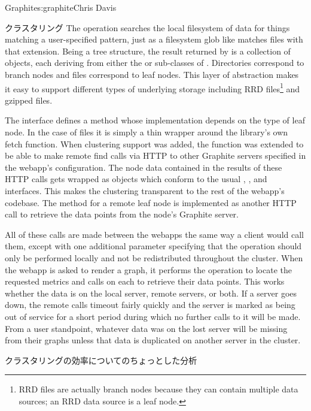 \begin{aosachapter}{Graphite}{s:graphite}{Chris Davis}
\begin{aosasect1}{クラスタリング}
The  operation searches the local filesystem of 
data for things matching a user-specified pattern, just as a filesystem
glob like  matches files with that extension.
Being a tree structure, the result returned by  is a
collection of  objects, each deriving from either the  or
 sub-classes of . Directories correspond to branch nodes and
 files correspond to leaf nodes.  This layer of abstraction
makes it easy to support different types of underlying storage
including RRD files\footnote{RRD files are actually branch nodes
because they can contain multiple data sources; an RRD data source
is a leaf node.} and gzipped  files.

The  interface defines a  method whose
implementation depends on the type of leaf node. In the case of
 files it is simply a thin wrapper around the  library's
own fetch function.  When clustering support was added, the
 function was extended to be able to make remote find calls
via HTTP to other Graphite servers specified in the webapp's
configuration. The node data contained in the results of these HTTP
calls gets wrapped as  objects which conform to the usual
, , and  interfaces. This makes the clustering
transparent to the rest of the webapp's codebase. The 
method for a remote leaf node is implemented as another HTTP call to
retrieve the data points from the node's Graphite server.

All of these calls are made between the webapps the same way a client
would call them, except with one additional parameter specifying that
the operation should only be performed locally and not be
redistributed throughout the cluster.  When the webapp is asked to
render a graph, it performs the  operation to locate the
requested metrics and calls  on each to retrieve their
data points. This works whether the data is on the local server,
remote servers, or both. If a server goes down, the remote calls
timeout fairly quickly and the server is marked as being out of
service for a short period during which no further calls to it will be
made. From a user standpoint, whatever data was on the lost server
will be missing from their graphs unless that data is duplicated on
another server in the cluster.

\begin{aosasect2}{クラスタリングの効率についてのちょっとした分析}


\end{aosasect2}
\end{aosasect1}
\end{aosachapter}
